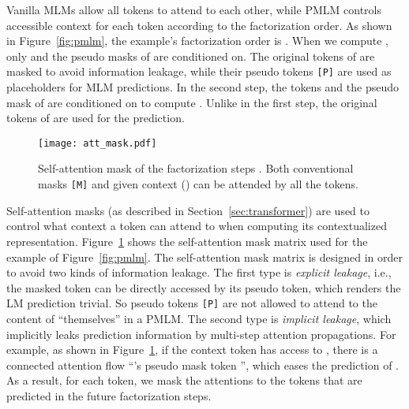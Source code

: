 \documentclass{article}
\newcommand\pmlm{\textsc{PMLM}}
\newcommand{\sptk}[1]{\texttt{[#1]}}
\begin{document}
Vanilla MLMs allow all tokens to attend to each other, while \pmlm{} controls accessible context for each token according to the factorization order.
As shown in Figure~\ref{fig:pmlm}, the example's factorization order is .
When we compute , only  and the pseudo masks of  are conditioned on. The original tokens of  are masked to avoid information leakage, while their pseudo tokens \sptk{P} are used as placeholders for MLM predictions.
In the second step, the tokens  and the pseudo mask of  are conditioned on to compute . Unlike in the first step, the original tokens of  are used for the prediction.


\begin{figure}[t]
\centering
\texttt{[image: att\_mask.pdf]}
\caption{
Self-attention mask of the factorization steps .
Both conventional masks \sptk{M} and given context () can be attended by all the tokens.
}
\label{fig:att:mask}
\end{figure}


Self-attention masks (as described in Section~\ref{sec:transformer}) are used to control what context a token can attend to when computing its contextualized representation.
Figure~\ref{fig:att:mask} shows the self-attention mask matrix used for the example of Figure~\ref{fig:pmlm}.
The self-attention mask matrix is designed in order to avoid two kinds of information leakage.
The first type is \textit{explicit leakage}, i.e., the masked token can be directly accessed by its pseudo token, which renders the LM prediction trivial. So pseudo tokens \sptk{P} are not allowed to attend to the content of ``themselves'' in a \pmlm{}.
The second type is \textit{implicit leakage}, which implicitly leaks prediction information by multi-step attention propagations.
For example, as shown in Figure~\ref{fig:att:mask}, if the context token  has access to , there is a connected attention flow ``'s pseudo mask token '', which eases the prediction of .
As a result, for each token, we mask the attentions to the tokens that are predicted in the future factorization steps.
\end{document}
